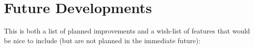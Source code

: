 \documentclass[12pt,a4paper]{article}
\newcommand{\ie}{i.e.\ }
\newcommand{\hipass}{{\sc hipass}}
\begin{document}
%
%
%
%
%
%
%

\section{Future Developments}

This is both a list of planned improvements and a wish-list of
features that would be nice to include (but are not planned in the
immediate future):
\end{document}
